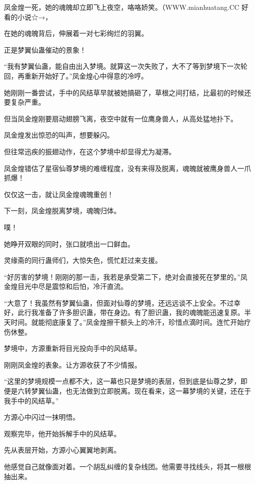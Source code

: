 
\begin{this_body}

凤金煌一死，她的魂魄却立即飞上夜空，咯咯娇笑。（WWW.mianhuatang.CC 好看的小说☆→，

在她的魂魄背后，伸展着一对七彩绚烂的羽翼。

正是梦翼仙蛊催动的景象！

“我有梦翼仙蛊，能自由出入梦境。就算这一次失败了，大不了等到梦境下一次轮回，再重新开始好了。”凤金煌心中得意的冷哼。

她刚刚一番尝试，手中的风结草早就被她搞砸了，草根之间打结，比最初的时候还要复杂严重。

但当凤金煌刚要扇动翅膀飞离，夜空中就有一位鹰身兽人，从高处猛地扑下。

凤金煌发出惊恐的叫声，想要躲闪。

但往常迅疾的振翅动作，在这个梦境中却显得尤为凝滞。

凤金煌错估了星宿仙尊梦境的难缠程度，没有来得及脱离，魂魄就被鹰身兽人一爪抓爆！

仅仅这一击，就让凤金煌魂魄重创！

下一刻，凤金煌脱离梦境，魂魄归体。

噗！

她睁开双眼的同时，张口就喷出一口鲜血。

灵缘斋的同行蛊师们，大惊失色，慌忙赶过来支援。

“好厉害的梦境！刚刚的那一击，我若是承受第二下，绝对会直接死在梦里的。”凤金煌目光中尽是震惊和后怕，冷汗直流。

“大意了！我虽然有梦翼仙蛊，但面对仙尊的梦境，还远远谈不上安全。不过幸好，此行我准备了许多胆识蛊，带在身边。有了胆识蛊，我的魂魄能迅速复原。半天时间。就能彻底康复了。”凤金煌擦干额头上的冷汗，珍惜点滴时间。连忙开始疗伤休整。

梦境中，方源重新将目光投向手中的风结草。

刚刚凤金煌的表象。让方源收获了不少情报。

“这里的梦境规模一点都不大，这一幕也只是梦境的表层，但到底是仙尊之梦，即便是六转梦翼仙蛊，也无法做到立即脱离。现在看来，这一幕梦境的关键，还在于我手中的风结草。”

方源心中闪过一抹明悟。

观察完毕，他开始拆解手中的风结草。

先从表层开始，方源小心翼翼地剥离。

他感觉自己就像面对着。一个胡乱纠缠的复杂线团。他需要寻找线头，将其一根根抽出来。


\end{this_body}
